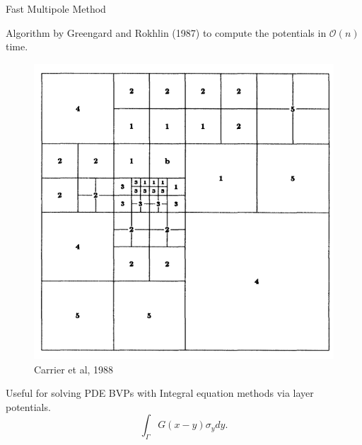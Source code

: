 \documentclass[10pt,usenames,dvipsnames]{beamer}
\begin{document}
\begin{frame}[fragile]{Fast Multipole Method}

Algorithm by Greengard and Rokhlin (1987) to compute the potentials in $\mathcal{O}(n)$ time.
\begin{figure}
\includegraphics[scale=0.15]{figures/quadtree.png}
\caption{Carrier et al, 1988}
\end{figure}
Useful for solving PDE BVPs with Integral equation methods via layer potentials.
\[
    \int_{\Gamma} G(x - y) \sigma_y dy.
\]
\end{frame}
\end{document}
